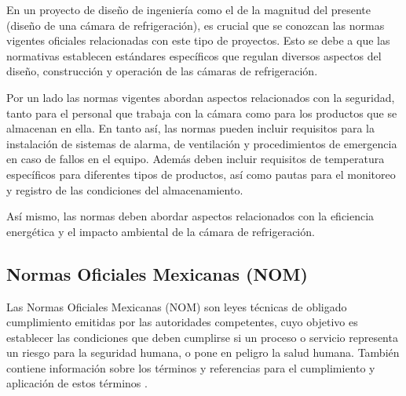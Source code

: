 \begin{enumerate}
	En un proyecto de diseño de ingeniería como el de la magnitud del presente (diseño de una cámara de refrigeración), es crucial que se conozcan las normas vigentes oficiales relacionadas con este tipo de proyectos. Esto se debe a que las normativas establecen estándares específicos que regulan diversos aspectos del diseño, construcción y operación de las cámaras de refrigeración.
	
	Por un lado las normas vigentes abordan aspectos relacionados con la seguridad, tanto para el personal que trabaja con la cámara como para los productos que se almacenan en ella. En tanto así, las normas pueden incluir requisitos para la instalación de sistemas de alarma, de ventilación y procedimientos de emergencia en caso de fallos en el equipo. Además deben incluir requisitos de temperatura específicos para diferentes tipos de productos, así como pautas para el monitoreo y registro de las condiciones del almacenamiento.
	
	Así mismo, las normas deben abordar aspectos relacionados con la eficiencia energética y el impacto ambiental de la cámara de refrigeración.
		
	\subsection{Normas Oficiales Mexicanas (NOM)}
	
		Las Normas Oficiales Mexicanas (NOM) son leyes técnicas de obligado cumplimiento emitidas por las autoridades competentes, cuyo objetivo es establecer las condiciones que deben cumplirse si un proceso o servicio representa un riesgo para la seguridad humana, o pone en peligro la salud humana. También contiene información sobre los términos y referencias para el cumplimiento y aplicación de estos términos \cite{salud-2022}.
		

\end{enumerate}
